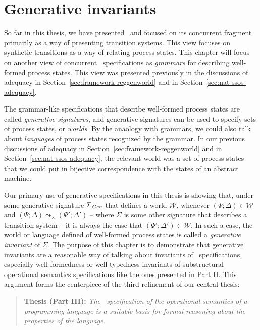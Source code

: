\chapter{Generative invariants}
\label{chapter-gen}

So far in this thesis, we have presented \sls~and focused on its
concurrent fragment primarily as a way of presenting transition
systems. This view focuses on synthetic transitions as a way of
relating process states. This chapter will focus on another view of
concurrent \sls~specifications as {\it grammars} for describing
well-formed process states. This view was presented previously in the
discussions of adequacy in Section~\ref{sec:framework-reggenworld} and
in Section~\ref{sec:nat-ssos-adequacy}.

The grammar-like specifications that describe well-formed process
states are called {\it generative signatures}, and generative
signatures can be used to specify sets of process states, or {\it
  worlds}. By the anaology with grammars, we could also talk about
{\it languages} of process states recognized by the grammar. In our
previous discussions of adequacy in
Section~\ref{sec:framework-reggenworld} and in
Section~\ref{sec:nat-ssos-adequacy}, the relevant world was a set of
process states that we could put in bijective correspondence with the
states of an abstract machine.  

Our primary use of generative specifications in this thesis is showing
that, under some generative signature $\Sigma_{\it Gen}$ that defines
a world $\mathcal W$, whenever $(\Psi; \Delta) \in \mathcal W$ and
$(\Psi; \Delta) \leadsto_\Sigma (\Psi'; \Delta')$ -- where $\Sigma$ is
some other signature that describes a transition system -- it is
always the case that $(\Psi'; \Delta') \in \mathcal W$. In such a
case, the world or language defined of well-formed process states is
called a {\it generative invariant} of $\Sigma$.  The purpose of this
chapter is to demonstrate that generative invariants are a reasonable
way of talking about invariants of \sls~specifications, especially
well-formedness or well-typedness invariants of substructural
operational semantics specifications like the ones presented in Part
II. This argument forms the centerpiece of the third refinement of our
central thesis:

\smallskip
\begin{quote} 
  {\bf Thesis (Part III):} {\it The \sls~specification of the operational
    semantics of a programming language is a suitable basis for formal
    reasoning about the properties of the language.}
\end{quote} 
\smallskip 

